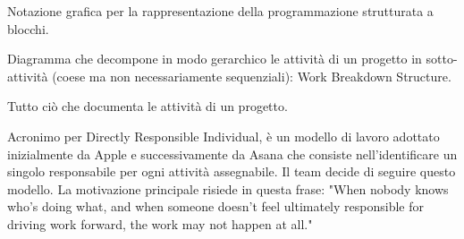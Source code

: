 \item[Diagramma Nassi–Shneiderman] Notazione grafica per la rappresentazione della programmazione strutturata a blocchi. 
\item[diagramma WBS] Diagramma che decompone in modo gerarchico le attività di un progetto in sotto-attività (coese ma non necessariamente sequenziali): Work Breakdown Structure.
\item[documentazione] Tutto ciò che documenta le attività di un progetto.
\item[DRI] Acronimo per Directly Responsible Individual, è un modello di lavoro adottato inizialmente da Apple e successivamente da Asana che consiste nell'identificare un singolo responsabile per ogni attività assegnabile. Il team decide di seguire questo modello. La motivazione principale risiede in questa frase: "When nobody knows who’s doing what, and when someone doesn’t feel ultimately responsible for driving work forward, the work may not happen at all."

